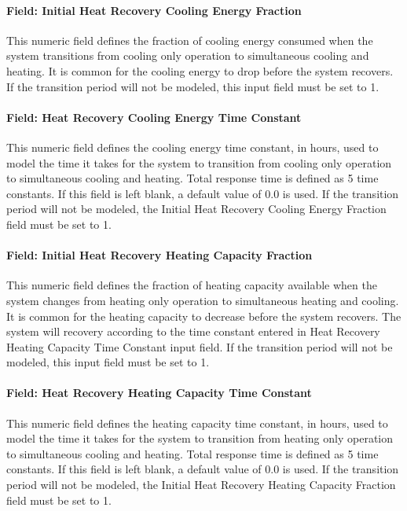 \paragraph{Field: Initial Heat Recovery Cooling Energy Fraction}

This numeric field defines the fraction of cooling energy consumed when the system transitions from cooling only operation to simultaneous cooling and heating. It is common for the cooling energy to drop before the system recovers. If the transition period will not be modeled, this input field must be set to 1.

\paragraph{Field: Heat Recovery Cooling Energy Time Constant}

This numeric field defines the cooling energy time constant, in hours, used to model the time it takes for the system to transition from cooling only operation to simultaneous cooling and heating. Total response time is defined as 5 time constants. If this field is left blank, a default value of 0.0 is used. If the transition period will not be modeled, the Initial Heat Recovery Cooling Energy Fraction field must be set to 1.

\paragraph{Field: Initial Heat Recovery Heating Capacity Fraction}

This numeric field defines the fraction of heating capacity available when the system changes from heating only operation to simultaneous heating and cooling. It is common for the heating capacity to decrease before the system recovers. The system will recovery according to the time constant entered in Heat Recovery Heating Capacity Time Constant input field. If the transition period will not be modeled, this input field must be set to 1.

\paragraph{Field: Heat Recovery Heating Capacity Time Constant}

This numeric field defines the heating capacity time constant, in hours, used to model the time it takes for the system to transition from heating only operation to simultaneous cooling and heating. Total response time is defined as 5 time constants. If this field is left blank, a default value of 0.0 is used. If the transition period will not be modeled, the Initial Heat Recovery Heating Capacity Fraction field must be set to 1.

